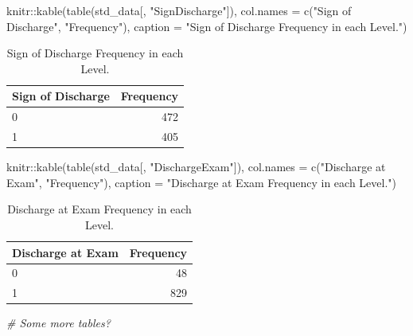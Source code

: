 \documentclass[
]{article}
\newenvironment{Shaded}{\begin{snugshade}}{\end{snugshade}}
\newcommand{\AttributeTok}[1]{\textcolor[rgb]{0.77,0.63,0.00}{#1}}
\newcommand{\CommentTok}[1]{\textcolor[rgb]{0.56,0.35,0.01}{\textit{#1}}}
\newcommand{\FunctionTok}[1]{\textcolor[rgb]{0.00,0.00,0.00}{#1}}
\newcommand{\NormalTok}[1]{#1}
\newcommand{\SpecialCharTok}[1]{\textcolor[rgb]{0.00,0.00,0.00}{#1}}
\newcommand{\StringTok}[1]{\textcolor[rgb]{0.31,0.60,0.02}{#1}}
\begin{document}
\begin{Shaded}
\begin{Highlighting}[]
\NormalTok{knitr}\SpecialCharTok{::}\FunctionTok{kable}\NormalTok{(}\FunctionTok{table}\NormalTok{(std\_data[, }\StringTok{"SignDischarge"}\NormalTok{]), }\AttributeTok{col.names =} \FunctionTok{c}\NormalTok{(}\StringTok{"Sign of Discharge"}\NormalTok{, }\StringTok{"Frequency"}\NormalTok{), }\AttributeTok{caption =} \StringTok{"Sign of Discharge Frequency in each Level."}\NormalTok{)}
\end{Highlighting}
\end{Shaded}

\begin{table}

\caption{\label{tab:unnamed-chunk-4}Sign of Discharge Frequency in each Level.}
\centering
\begin{tabular}[t]{l|r}
\hline
Sign of Discharge & Frequency\\
\hline
0 & 472\\
\hline
1 & 405\\
\hline
\end{tabular}
\end{table}

\begin{Shaded}
\begin{Highlighting}[]
\NormalTok{knitr}\SpecialCharTok{::}\FunctionTok{kable}\NormalTok{(}\FunctionTok{table}\NormalTok{(std\_data[, }\StringTok{"DischargeExam"}\NormalTok{]), }\AttributeTok{col.names =} \FunctionTok{c}\NormalTok{(}\StringTok{"Discharge at Exam"}\NormalTok{, }\StringTok{"Frequency"}\NormalTok{), }\AttributeTok{caption =} \StringTok{"Discharge at Exam Frequency in each Level."}\NormalTok{)}
\end{Highlighting}
\end{Shaded}

\begin{table}

\caption{\label{tab:unnamed-chunk-4}Discharge at Exam Frequency in each Level.}
\centering
\begin{tabular}[t]{l|r}
\hline
Discharge at Exam & Frequency\\
\hline
0 & 48\\
\hline
1 & 829\\
\hline
\end{tabular}
\end{table}

\begin{Shaded}
\begin{Highlighting}[]
\CommentTok{\# Some more tables?}
\end{Highlighting}
\end{Shaded}
\end{document}

